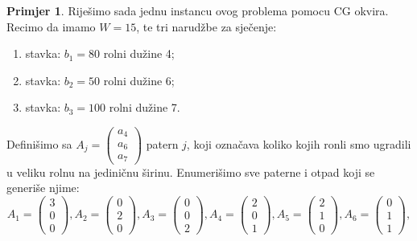 \documentclass[a4paper, utf8, 11pt, colorlinks]{book}
\theoremstyle{definition}
\newtheorem{primjer}{Primjer}[chapter]
\begin{document}
\begin{primjer} Riješimo sada jednu instancu ovog problema pomocu CG okvira. Recimo da imamo $W = 15$, te tri narudžbe za sječenje:
	\end{primjer}
 \begin{enumerate}
 	\item stavka: $b_1=80$ rolni dužine 4;
 	\item stavka: $b_2=50$ rolni dužine 6;
 	\item stavka: $b_3=100$ rolni dužine 7. 
 \end{enumerate}
 Definišimo sa $A_j = \begin{pmatrix}
                          a_4 \\
                          a_6 \\
                          a_7
                   \end{pmatrix}$
                 patern $j$, koji označava koliko   kojih ronli smo ugradili u veliku rolnu na jediničnu širinu. Enumerišimo sve paterne i otpad koji se generiše njime: 
               $$A_1 = 
               \begin{pmatrix}
               	     3 \\
               	     0 \\
               	     0  
               \end{pmatrix},
               A_2=\begin{pmatrix}
                 	0 \\
                	2 \\
                	0  
               \end{pmatrix}, 
           A_3=\begin{pmatrix}
           	0 \\
           	0 \\
           	2  
         \end{pmatrix},
           A_4=  \begin{pmatrix}
           	2 \\
           	0 \\
           	1  
           \end{pmatrix},
       A_5 = \begin{pmatrix}
       	2 \\
       	1 \\
       	0  
       \end{pmatrix},
   A_6 =\begin{pmatrix}
      	0 \\
        1 \\
      	1  
   \end{pmatrix},$$
\end{document}
